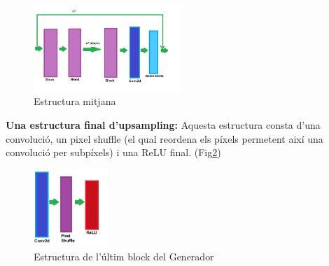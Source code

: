 ﻿\documentclass[10pt,a4paper,twocolumn,twoside]{article}
\begin{document}
\begin{figure}[h]
\centering
\includegraphics[width=0.5\textwidth]{img/partdelmitg.png}
\caption{Estructura mitjana}
\label{mitjana}
\end{figure}

\textbf{Una estructura final d'upsampling: }Aquesta estructura consta d'una convolució, un pixel shuffle (el qual reordena els píxels permetent així una convolució per subpíxels) i una ReLU final. (Fig\ref{ultimblock})\\

\begin{figure}[h]
\centering
\includegraphics[width=0.25\textwidth]{img/finalBlockGen.png}
\caption{Estructura de l'últim block del Generador}
\label{ultimblock}
\end{figure}
\end{document}
